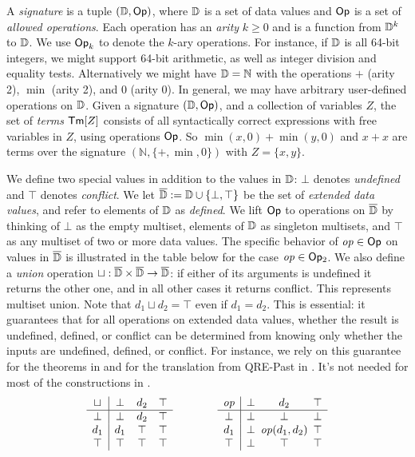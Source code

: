 A \emph{signature} is a tuple $(\mathbb{D}, \textsf{Op})$,
where $\mathbb{D}$ is a set of data values
and $\textsf{Op}$ is a set of \emph{allowed operations}.
Each operation has an \emph{arity} $k \ge 0$
and is a function from $\mathbb{D}^k$ to $\mathbb{D}$.
We use $\textsf{Op}_k$ to denote the $k$-ary operations.
For instance, if $\mathbb{D}$ is all 64-bit integers, we might support 64-bit arithmetic, as well as
integer division and equality tests.
Alternatively we might have $\mathbb{D} = \mathbb{N}$
with the operations $+$ (arity 2), $\min$ (arity 2), and $0$ (arity 0).
In general, we may have arbitrary user-defined operations on $\mathbb{D}$.
Given a signature $(\mathbb{D}, \textsf{Op})$,
and a collection of variables $Z$,
the set of \emph{terms} $\textsf{Tm}[Z]$
consists of all syntactically correct expressions
with free variables in $Z$, using operations $\textsf{Op}$.
So $\min(x,0) + \min(y,0)$ and $x + x$
are terms over the signature $(\mathbb{N}, \{+,\min,0\})$ with $Z = \{x,y\}$.

We define two special values in addition to
the values in $\mathbb{D}$: $\bot$ denotes \emph{undefined}
and $\top$ denotes \emph{conflict}.
We let $\overline{\mathbb{D}{}} := \mathbb{D} \cup \{\bot, \top\}$ be the set of \emph{extended data values},
and refer to elements of $\mathbb{D}$ as \emph{defined}.
We lift $\textsf{Op}$ to operations on $\overline{\mathbb{D}{}}$ by thinking of $\bot$ as the empty multiset,
elements of $\mathbb{D}$ as singleton multisets, and $\top$ as any multiset of two or more data values.
The specific behavior of $\mathit{op} \in \textsf{Op}$ on values in $\overline{\mathbb{D}{}}$
is illustrated in the table below
for the case $\mathit{op} \in \textsf{Op}{}_2$.
We also define a \emph{union} operation $\sqcup: \overline{\mathbb{D}{}} \times \overline{\mathbb{D}{}} \to \overline{\mathbb{D}{}}$:
if either of its arguments is undefined it returns the other one,
and in all other cases it returns conflict.
This represents multiset union. Note that $d_1 \sqcup d_2 = \top$ even if $d_1 = d_2$.
This is essential: it guarantees that for all operations on extended data values, whether the result is undefined, defined, or conflict can be determined from knowing only whether the inputs are undefined, defined, or conflict.
For instance, we rely on this guarantee for the theorems in
 and for the translation from QRE-Past in . It's not needed for most of the constructions in .
\[
\begin{array}{c|ccc}
\sqcup & \bot & d_2 & \top \\
\hline
\bot & \bot & d_2 & \top \\
d_1 & d_1 & \top & \top \\
\top & \top & \top & \top
\end{array}
\qquad \qquad
\begin{array}{c|ccc}
\mathit{op} & \bot & d_2 & \top \\
\hline
\bot & \bot & \bot & \bot \\
d_1 & \bot & \hspace{-5pt}\mathit{op}(d_1,d_2)\hspace{-5pt} & \top \\
\top & \bot & \top & \top
\end{array}
\]

